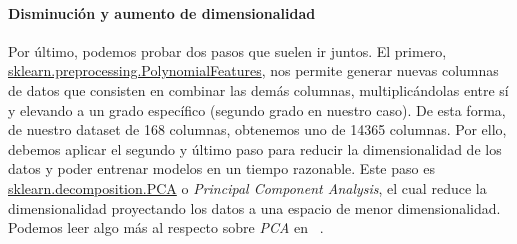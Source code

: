 \paragraph{Disminución y aumento de dimensionalidad}

Por último, podemos probar dos pasos que suelen ir juntos. El primero, \href{https://scikit-learn.org/stable/modules/generated/sklearn.preprocessing.PolynomialFeatures.html}{sklearn.preprocessing.PolynomialFeatures}, nos permite generar nuevas columnas de datos que consisten en combinar las demás columnas, multiplicándolas entre sí y elevando a un grado específico (segundo grado en nuestro caso). De esta forma, de nuestro \gls{dataset} de 168 columnas, obtenemos uno de 14365 columnas. Por ello, debemos aplicar el segundo y último paso para reducir la dimensionalidad de los datos y poder entrenar modelos en un tiempo razonable. Este paso es \href{https://scikit-learn.org/stable/modules/generated/sklearn.decomposition.PCA.html}{sklearn.decomposition.PCA} o \textit{Principal Component Analysis}, el cual reduce la dimensionalidad proyectando los datos a una espacio de menor dimensionalidad. Podemos leer algo más al respecto sobre \textit{PCA} en \ \cite{Principa62:online}. 